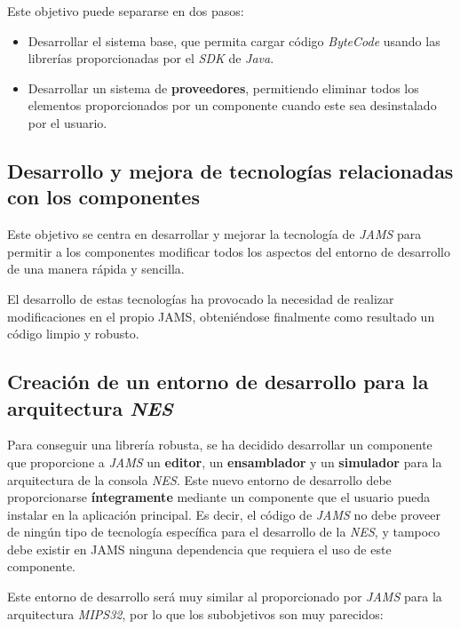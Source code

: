 \noexpand Este objetivo puede separarse en dos pasos:
\begin{itemize}
    \item Desarrollar el sistema base, que permita cargar código \textit{ByteCode}
    usando las librerías proporcionadas por el \textit{SDK} de \textit{Java}.
    \item Desarrollar un sistema de \textbf{proveedores}, permitiendo
    eliminar todos los elementos proporcionados por un componente
    cuando este sea desinstalado por el usuario.
\end{itemize}

\subsection{Desarrollo y mejora de tecnologías relacionadas con los componentes}
\label{subsec:desarrollo-y-mejora-de-tecnologias-relacionadas-con-los-componentes}

Este objetivo se centra en desarrollar y mejorar la tecnología de \textit{JAMS}
para permitir a los componentes modificar todos los aspectos del entorno de
desarrollo de una manera rápida y sencilla.

El desarrollo de estas tecnologías ha provocado la necesidad de
realizar modificaciones en el propio JAMS,
obteniéndose finalmente como resultado un código limpio y robusto.

\subsection{Creación de un entorno de desarrollo para la arquitectura \textit{NES}}
\label{subsec:creacion-de-un-entorno-de-desarrollo-para-la-arquitectura-mips32}

Para conseguir una librería robusta, se ha decidido desarrollar un componente
que proporcione a \textit{JAMS} un \textbf{editor}, un
\textbf{ensamblador} y un \textbf{simulador}
para la arquitectura de la consola \textit{NES}.
Este nuevo entorno de desarrollo debe proporcionarse \textbf{íntegramente}
mediante un componente que el usuario pueda instalar en la aplicación
principal.
Es decir, el código de \textit{JAMS} no debe proveer de ningún
tipo de tecnología específica para el desarrollo de la \textit{NES},
y tampoco debe existir en JAMS ninguna dependencia que requiera el uso de este componente.

Este entorno de desarrollo será muy similar al proporcionado
por \textit{JAMS} para la arquitectura \textit{MIPS32}, por lo que los
subobjetivos son muy parecidos:

